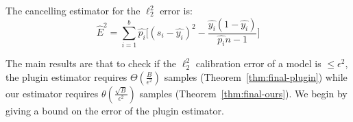 \begin{definition}
The cancelling estimator for the $\ell_2^2$ error is:
\[ \hat{E}^2 = \sum_{i=1}^b \hat{p_i} \Big[ (s_i - \hat{y_i})^2 - \frac{\hat{y_i}(1 - \hat{y_i})}{\hat{p_i}n-1} \Big] \]
\end{definition}

The main results are that to check if the $\ell_2^2$ calibration error of a model is $\leq \epsilon^2$, the plugin estimator requires $\Theta(\frac{B}{\epsilon^2})$ samples (Theorem~\ref{thm:final-plugin}) while our estimator requires $\theta(\frac{\sqrt{B}}{\epsilon^2})$ samples (Theorem~\ref{thm:final-ours}). We begin by giving a bound on the error of the plugin estimator.


 




